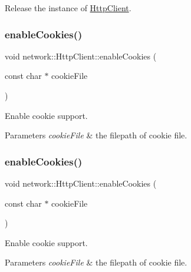 Release the instance of \hyperlink{classnetwork_1_1HttpClient}{Http\+Client}. \mbox{\label{classnetwork_1_1HttpClient_a522608f82b2dad340931c2d83265a1bf}} 
\subsubsection{\texorpdfstring{enable\+Cookies()}{enableCookies()}\hspace{0.1cm}{\footnotesize\ttfamily [1/2]}}
{\footnotesize\ttfamily void network\+::\+Http\+Client\+::enable\+Cookies (\begin{DoxyParamCaption}\item[{const char $\ast$}]{cookie\+File }\end{DoxyParamCaption})}

Enable cookie support.


\begin{DoxyParams}{Parameters}
{\em cookie\+File} & the filepath of cookie file. \\
\hline
\end{DoxyParams}
\mbox{\label{classnetwork_1_1HttpClient_a522608f82b2dad340931c2d83265a1bf}} 
\subsubsection{\texorpdfstring{enable\+Cookies()}{enableCookies()}\hspace{0.1cm}{\footnotesize\ttfamily [2/2]}}
{\footnotesize\ttfamily void network\+::\+Http\+Client\+::enable\+Cookies (\begin{DoxyParamCaption}\item[{const char $\ast$}]{cookie\+File }\end{DoxyParamCaption})}

Enable cookie support.


\begin{DoxyParams}{Parameters}
{\em cookie\+File} & the filepath of cookie file. \\
\hline
\end{DoxyParams}
\mbox{\label{classnetwork_1_1HttpClient_ae97920b1e10b7617ccbde99cf5c2c2a0}} 
